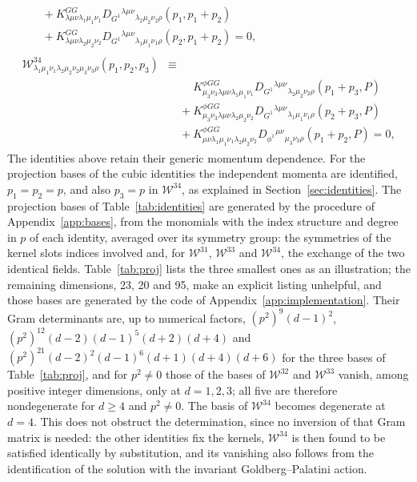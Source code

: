 \documentclass[prd,aps,preprint,superscriptaddress,nofootinbib,amsmath,amssymb,eqsecnum]{revtex4-2}
\newcommand{\W}{\mathcal{W}}
\providecommand{\DIFaddtex}[1]{{\protect\color{blue} \sf #1}} %
\providecommand{\DIFdeltex}[1]{{\protect\color{red} \scriptsize #1}} %
\providecommand{\DIFaddbegin}{} %
\providecommand{\DIFaddend}{} %
\providecommand{\DIFdelbegin}{} %
\providecommand{\DIFdelend}{} %
\providecommand{\DIFadd}[1]{\texorpdfstring{\DIFaddtex{#1}}{#1}} %
\providecommand{\DIFdel}[1]{\texorpdfstring{\DIFdeltex{#1}}{}} %
\begin{document}
\begin{align}
\begin{split}
&\quad+K^{GG}_{\lambda\mu\nu\lambda_1\mu_1\nu_1}D_{G^1}{}^{\lambda\mu\nu}{}_{\lambda_2\mu_2\nu_2\rho}(p_1,p_1+p_2)\\
&\quad+K^{GG}_{\lambda\mu\nu\lambda_2\mu_2\nu_2}D_{G^1}{}^{\lambda\mu\nu}{}_{\lambda_1\mu_1\nu_1\rho}(p_2,p_1+p_2)=0,
\end{split}\\
\begin{split}
\W^{34}_{\lambda_1\mu_1\nu_1\lambda_2\mu_2\nu_2\mu_3\nu_3\rho}(p_1,p_2,p_3)&\equiv\\
&\quad\phantom{+}K^{\phi GG}_{\mu_3\nu_3\lambda\mu\nu\lambda_1\mu_1\nu_1}D_{G^1}{}^{\lambda\mu\nu}{}_{\lambda_2\mu_2\nu_2\rho}(p_1+p_3,P)\\
&\quad+K^{\phi GG}_{\mu_3\nu_3\lambda\mu\nu\lambda_2\mu_2\nu_2}D_{G^1}{}^{\lambda\mu\nu}{}_{\lambda_1\mu_1\nu_1\rho}(p_2+p_3,P)\\
&\quad+K^{\phi GG}_{\mu\nu\lambda_1\mu_1\nu_1\lambda_2\mu_2\nu_2}D_{\phi^1}{}^{\mu\nu}{}_{\mu_3\nu_3\rho}(p_1+p_2,P)=0,
\end{split}
\end{align}
The identities above retain their generic momentum dependence. For the projection bases
of the cubic identities the independent momenta are identified, $p_1=p_2=p$, and also
$p_3=p$ in $\W^{34}$, as explained in Section~\ref{sec:identities}. The projection bases of
Table~\ref{tab:identities} are generated by the procedure of Appendix~\ref{app:bases}, from
the monomials with the index structure and degree in $p$ of each identity, averaged over its
symmetry group: the symmetries of the kernel \DIFdelbegin \DIFdel{slots }\DIFdelend \DIFaddbegin \DIFadd{indices }\DIFaddend involved
and, for $\W^{31}$, $\W^{33}$ and $\W^{34}$, the exchange of the two identical fields.
Table~\ref{tab:proj} lists the three smallest ones as an illustration; the remaining
dimensions, 23, 20 and 95, make an explicit listing unhelpful, and those bases are generated
by the code of Appendix~\ref{app:implementation}. Their Gram determinants are, up to
numerical factors, $(p^2)^9(d-1)^2$, $(p^2)^{12}(d-2)(d-1)^5(d+2)(d+4)$ and
$(p^2)^{21}(d-2)^2(d-1)^6(d+1)(d+4)(d+6)$ for the three bases of Table~\ref{tab:proj}, and
for $p^2\neq0$ those of the bases of $\W^{32}$ and $\W^{33}$ vanish, among positive
integer dimensions, only at $d=1,2,3$; all five are therefore nondegenerate for $d\geq4$ and
$p^2\neq0$. The basis of $\W^{34}$ becomes degenerate at $d=4$. This does not obstruct the
determination, since no inversion of that Gram matrix is needed: the other identities fix
the kernels, $\W^{34}$ is then found to be satisfied identically by substitution, and its
vanishing also follows from the identification of the solution with the invariant
Goldberg--Palatini action.
\end{document}
